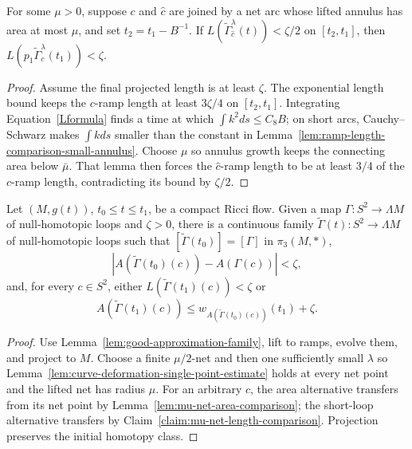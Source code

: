 \begin{claim}
\label{claim:mu-net-length-comparison}
\label{mulength}
For some $\mu>0$, suppose $c$ and $\hat c$ are joined by a net arc whose
lifted annulus has area at most $\mu$, and set $t_2=t_1-B^{-1}$. If
$L(\widetilde\Gamma_{\hat c}^\lambda(t))<\zeta/2$ on $[t_2,t_1]$, then
$L(p_1\widetilde\Gamma_c^\lambda(t_1))<\zeta$.
\end{claim}
\begin{proof}

\sketch Assume the final projected length is at least $\zeta$. The exponential length
bound keeps the $c$-ramp length at least $3\zeta/4$ on $[t_2,t_1]$. Integrating
Equation~\eqref{Lformula} finds a time at which $\int k^2ds\le C_8B$; on short
arcs, Cauchy--Schwarz makes $\int kds$ smaller than the constant in
Lemma~\ref{lem:ramp-length-comparison-small-annulus}. Choose $\mu$ so annulus
growth keeps the connecting area below $\bar\mu$. That lemma then forces the
$\hat c$-ramp length to be at least $3/4$ of the $c$-ramp length, contradicting
its bound by $\zeta/2$.
\end{proof}

\begin{proposition}
\label{prop:curve-deformation-existence}
\label{XI}

Let $(M,g(t))$, $t_0\le t\le t_1$, be a compact Ricci flow. Given a map
$\Gamma\colon S^2\to\Lambda M$ of null-homotopic loops and $\zeta>0$, there
is a continuous family
$\widetilde\Gamma(t)\colon S^2\to\Lambda M$ of null-homotopic loops such that
$[\widetilde\Gamma(t_0)]=[\Gamma]$ in $\pi_3(M,*)$,
\[
|A(\widetilde\Gamma(t_0)(c))-A(\Gamma(c))|<\zeta,
\]
and, for every $c\in S^2$, either
$L(\widetilde\Gamma(t_1)(c))<\zeta$ or
\[
A(\widetilde\Gamma(t_1)(c))
\le w_{A(\widetilde\Gamma(t_0)(c))}(t_1)+\zeta.
\]
\end{proposition}
\begin{proof}
\sketch Use Lemma~\ref{lem:good-approximation-family}, lift to ramps, evolve them, and
project to $M$. Choose a finite $\mu/2$-net and then one sufficiently small
$\lambda$ so Lemma~\ref{lem:curve-deformation-single-point-estimate} holds at
every net point and the lifted net has radius $\mu$. For an arbitrary $c$, the
area alternative transfers from its net point by
Lemma~\ref{lem:mu-net-area-comparison}; the short-loop alternative transfers by
Claim~\ref{claim:mu-net-length-comparison}. Projection preserves the initial
homotopy class.
\end{proof}

